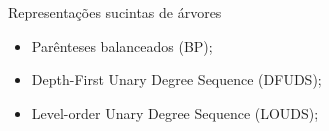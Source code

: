 \begin{frame}{Representações sucintas de árvores}
\begin{itemize}
    \item Parênteses balanceados (BP);
    \item Depth-First Unary Degree Sequence (DFUDS);
    \item Level-order Unary Degree Sequence (LOUDS);
\end{itemize}    
\end{frame}





